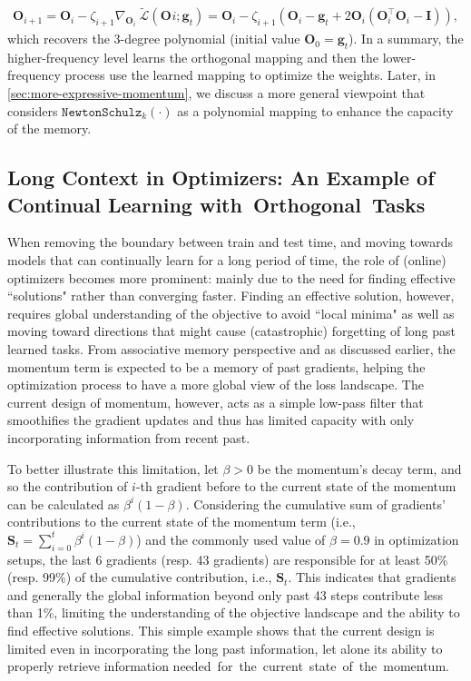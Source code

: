 \documentclass{article}
\newcommand{\vg}{\boldsymbol{g}}
\newcommand{\vo}{\boldsymbol{O}}
\begin{document}
\begin{align}\label{eq:muon2}
    \vo_{i+1} = \vo_{i} - \zeta_{i+1} \nabla_{\vo_{i}} \:\tilde{\mathcal{L}}\left(\vo_{}i; \vg_{t}\right) = \vo_{i} - \zeta_{i+1} \left( \vo_{i} - \vg_{t} +  2 \vo_i \left(\vo_i^{\top} \vo_i - \boldsymbol{I}\right) \right),
\end{align}
which recovers the 3-degree polynomial (initial value $\vo_{0} = \vg_t$). In a summary, the higher-frequency level learns the orthogonal mapping and then the lower-frequency process use the learned mapping to optimize the weights.  Later, in \autoref{sec:more-expressive-momentum}, we discuss a more general viewpoint that considers $\texttt{NewtonSchulz}_k\left(\cdot \right)$ as a polynomial mapping to enhance the capacity of the memory. 

\subsection{Long Context in Optimizers: An Example of Continual Learning with~Orthogonal~Tasks} \label{sec:Optimizers-continual-learning}
When removing the boundary between train and test time, and  moving towards models that can continually learn for a long period of time, the role of (online) optimizers becomes more prominent: mainly due to the need for finding effective ``solutions" rather than converging faster. Finding an effective solution, however, requires global understanding of the objective to avoid ``local minima" as well as moving toward directions that might cause (catastrophic) forgetting of long past learned tasks. From associative memory perspective and as discussed earlier, the momentum term is expected to be a memory of past gradients, helping the optimization process to have a more global view of the loss landscape. The current design of momentum, however, acts as a simple low-pass filter that smoothifies the gradient updates and thus has limited capacity with only incorporating information from recent past. 

To better illustrate this limitation, let $\beta > 0$ be the momentum's decay term, and so the contribution of $i$-th gradient before to the current state of the momentum can be calculated as $\beta^{i} \left(1 - \beta\right)$. Considering the cumulative sum of gradients' contributions to the current state of the momentum term (i.e., $\boldsymbol{S}_t = \sum_{i = 0}^{t}  \beta^{i} (1-\beta)$) and the commonly used value of $\beta = 0.9$ in optimization setups, the last 6 gradients (resp. 43 gradients) are responsible for at least 50\% (resp. 99\%) of the cumulative contribution, i.e., $\boldsymbol{S}_t$. This indicates that gradients and generally the global information beyond only past 43 steps contribute less than 1\%, limiting the understanding of the  objective landscape and the ability to find effective solutions. This simple example shows that the current design is limited even in incorporating the long past information, let alone its ability to properly retrieve information needed~for~the~current~state~of~the~momentum.  
\end{document}
